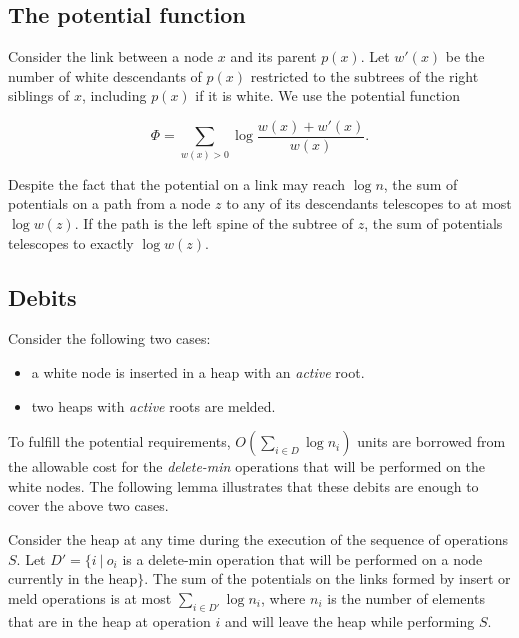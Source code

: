 \subsection{The potential function}  

Consider the link between a node $x$ and its parent $p(x)$.
Let $w'(x)$ be the number of white descendants of $p(x)$ restricted to the subtrees of the right siblings of $x$, including $p(x)$ if it is white. 
We use the potential function
 
\[\Phi = \sum_{w(x) > 0} \log{\frac{w(x)+w'(x)}{w(x)}}.\] 


Despite the fact that the potential on a link may reach $\log{n}$, the sum of potentials on a path from a node $z$ to any of its descendants telescopes to at most $\log{w(z)}$. If the path is the left spine of the subtree of $z$, the sum of potentials telescopes to exactly  $\log{w(z)}$. 


\subsection{Debits}

Consider the following two cases:
\begin{itemize}
\item a white node is inserted in a heap with an {\it active} root. 
\item two heaps with {\it active} roots are melded. 
\end{itemize}

To fulfill the potential requirements, $O(\sum_{i \in D} \log{n_i})$ units are borrowed from the allowable cost for the {\it delete-min} operations that will be performed on the white nodes. The following lemma illustrates that these debits are enough to cover the above two cases.

\begin{lemma}
\label{l1}
Consider the heap at any time during the execution of the sequence of operations $S$. Let $D' = \{i ~|~ o_i$ is a delete-min operation that will be performed on a node currently in the heap$\}$.
The sum of the potentials on the links formed by insert or meld operations is at most $\sum_{i \in D'} \log{n_i}$, where $n_i$ is the number of elements that are in the heap at operation $i$ and will leave the heap while performing $S$. 
\end{lemma}

